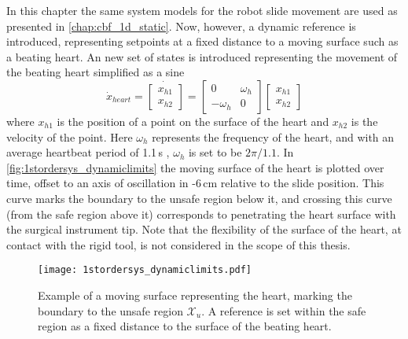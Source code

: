 In this chapter the same system models for the robot slide movement are used as presented in \autoref{chap:cbf_1d_static}. Now, however, a dynamic reference is introduced, representing setpoints at a fixed distance to a moving surface such as a beating heart. An new set of states is introduced representing the movement of the beating heart simplified as a sine
\begin{equation}
\dot{x}_{heart} =
\dot{\begin{bmatrix}
x_{h1}\\x_{h2}
\end{bmatrix}} =
\begin{bmatrix}
0 & \omega_h \\ -\omega_h & 0
\end{bmatrix}
\begin{bmatrix}
x_{h1}\\x_{h2}
\end{bmatrix}
\label{eq:beating_heart_sine}
\end{equation}
where $x_{h1}$ is the position of a point on the surface of the heart and $x_{h2}$ is the velocity of the point.
Here $\omega_h$ represents the frequency of the heart, and with an average heartbeat period of 1.1\,s \citep{bib:heart_berkeley}, $\omega_h$ is set to be $2\pi/1.1$. In \autoref{fig:1stordersys_dynamiclimits} the moving surface of the heart is plotted over time, offset to an axis of oscillation in -6\,cm relative to the slide position. This curve marks the boundary to the unsafe region below it, and crossing this curve (from the safe region above it) corresponds to penetrating the heart surface with the surgical instrument tip. Note that the flexibility of the surface of the heart, at contact with the rigid tool, is not considered in the scope of this thesis. 

\begin{figure}[htbp]
	\centering
	\texttt{[image: 1stordersys\_dynamiclimits.pdf]}
	\caption{Example of a moving surface representing the heart, marking the boundary to the unsafe region $\mathcal{X}_u$. A reference is set within the safe region as a fixed distance to the surface of the beating heart.}
	\label{fig:1stordersys_dynamiclimits}
\end{figure}

